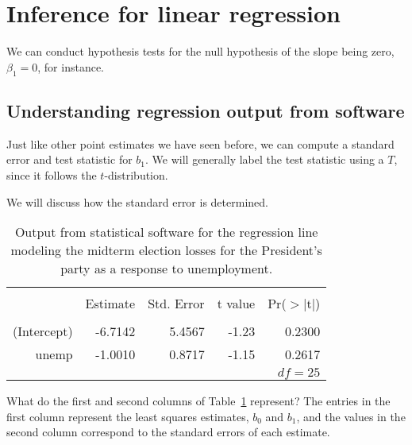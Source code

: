 \section{Inference for linear regression}
\label{inferenceForLinearRegression}

We can conduct hypothesis tests for the null hypothesis of the slope being zero, $\beta_1=0$, for instance.


\subsection{Understanding regression output from software}
\label{testStatisticForTheSlope}

Just like other point estimates we have seen before, we can compute a standard error and test statistic for $b_1$. We will generally label the test statistic using a $T$, since it follows the $t$-distribution.

We will discuss how the standard error is determined. 

\begin{table}%
\centering
\begin{tabular}{rrrrr}
  \hline
  \vspace{-3.7mm} & & & & \\
 & Estimate & Std. Error & t value & Pr($>$$|$t$|$) \\ 
  \hline
  \vspace{-3.6mm} & & & & \\
(Intercept) & -6.7142 & 5.4567 & -1.23 & 0.2300 \\ 
  unemp & -1.0010 & 0.8717 & -1.15 & 0.2617 \\ 
   \hline
   \multicolumn{5}{r}{$df=25$} \\
\end{tabular}
\caption{Output from statistical software for the regression line modeling the midterm election losses for the President's party as a response to unemployment.}
\label{midtermElectionUnemploymentRRegressionOutput}
\end{table}

\begin{example}{What do the first and second columns of Table~\ref{midtermElectionUnemploymentRRegressionOutput} represent?}
The entries in the first column represent the least squares estimates, $b_0$ and $b_1$, and the values in the second column correspond to the standard errors of each estimate.
\end{example}

